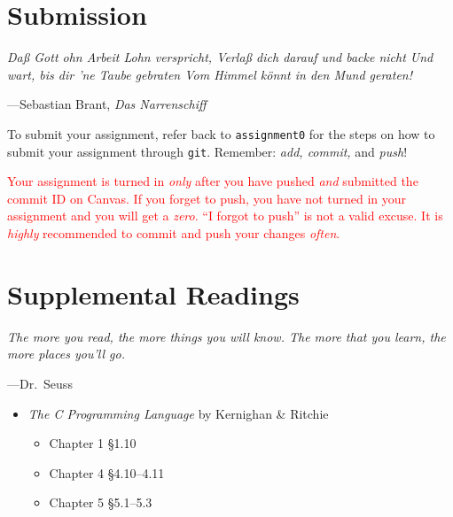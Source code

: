 \documentclass[11pt]{article}
\begin{document}

\section{Submission}
\epigraph{\emph{Da\ss{} Gott ohn Arbeit Lohn verspricht, Verla\ss{} dich darauf
und backe nicht Und wart, bis dir 'ne Taube gebraten Vom Himmel k\"onnt in den
Mund geraten!}}{---Sebastian Brant, \emph{Das Narrenschiff}}

To submit your assignment, refer back to \texttt{assignment0} for the steps on
how to submit your assignment through \texttt{git}.  Remember: \emph{add,
commit,} and \emph{push}!

\textcolor{red}{Your assignment is turned in \emph{only} after you have pushed
    \emph{and} submitted the commit ID on Canvas. If you forget to push, you
    have not turned in your assignment and you will get a \emph{zero}. ``I
    forgot to push'' is not a valid excuse. It is \emph{highly} recommended to
commit and push your changes \emph{often}.}

\section{Supplemental Readings}
\epigraph{\emph{The more you read, the more things you will know. The
more that you learn, the more places you'll go.}}{---Dr.\ Seuss}\noindent

\begin{itemize}
    \item \textit{The C Programming Language} by Kernighan \& Ritchie
    \begin{itemize}
	\item Chapter 1 \S 1.10
        \item Chapter 4 \S 4.10--4.11
        \item Chapter 5 \S 5.1--5.3
    \end{itemize}
\end{itemize}
\end{document}
